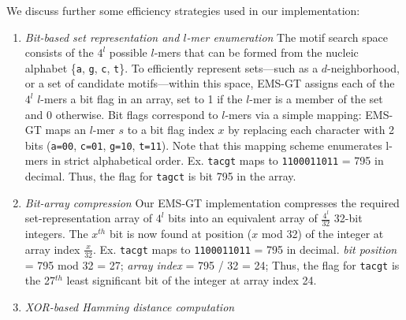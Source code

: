 \documentclass{acm_proc_article-sp}
\begin{document}
		We discuss further some efficiency strategies used in our implementation:
		\begin{enumerate} %
		\item{\em Bit-based set representation and $l$-mer enumeration}\newline
			The motif search space consists of the $4^{l}$ possible $l$-mers that can be formed from the nucleic alphabet \{\texttt{a}, \texttt{g}, \texttt{c}, \texttt{t}\}.
			To efficiently represent sets---such as a $d$-neighborhood, or a set of candidate motifs---within
			this space, EMS-GT assigns each of the $4^{l}$ $l$-mers a bit flag in an array,
			set to 1 if the $l$-mer is a member of the set and 0 otherwise.
			Bit flags correspond to $l$-mers via a simple mapping:
			EMS-GT maps an $l$-mer $s$ to a bit flag index $x$ by replacing each character with 2 bits 
			(\texttt{a=00}, \texttt{c=01}, \texttt{g=10}, \texttt{t=11}).
			Note that this mapping scheme enumerates l-mers in strict alphabetical order. \newline \newline
			{\small Ex. \texttt{tacgt} maps to \texttt{1100011011} = 795 in decimal. \newline
				\hspace*{18pt} Thus, the flag for \texttt{tagct} is bit 795 in the array.}	
		\item{\em Bit-array compression}\newline
			Our EMS-GT implementation compresses the required set-representation array of $4^{l}$ bits into an equivalent array of $\frac{4^{l}}{32}$ 32-bit integers. The $x^{th}$ bit is now found at position ($x$ mod 32) of the integer at array index $\frac{x}{32}$. \newline \newline
			{\small Ex. \texttt{tacgt} maps to \texttt{1100011011} = 795 in decimal.\newline
				\hspace*{18pt} \emph{bit position} = 795 mod 32 = 27;\newline
				\hspace*{18pt} \emph{array index}  = 795 / 32 = 24;\newline
				\hspace*{18pt}Thus, the flag for \texttt{tacgt} is the 27$^{th}$ least significant bit\newline
				\hspace*{18pt} of the integer at array index 24.}
		\item{\em XOR-based Hamming distance computation}\newline

\end{enumerate}
\end{document}
